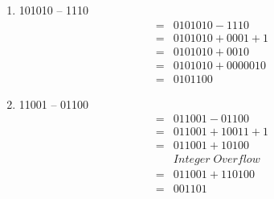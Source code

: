 \documentclass[12pt,letterpaper,titlepage]{report}
\begin{document}
\begin{raggedright}
\begin{multicols}{2}
\begin{enumerate} [label=\alph*)]
\begin{align*}
\\=& 0101101 + 1100000
\\=& 0001101
\end{align*}
\item 101010 – 1110
\begin{align*}
  =& 0101010 - 1110
\\=& 0101010 + 0001 + 1
\\=& 0101010 + 0010
\\=& 0101010 + 0000010
\\=& 0101100
\end{align*}
\item 11001 – 01100
\begin{align*}
  =& 011001 - 01100
\\=& 011001 + 10011 + 1
\\=& 011001 + 10100
\\ & Integer\;Overflow
\\=& 011001 + 110100
\\=& 001101
\end{align*}
\end{enumerate}
\end{multicols}
\clearpage


\end{raggedright}
\end{document}
